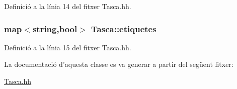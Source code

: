 Definició a la línia 14 del fitxer Tasca.\-hh.

\hypertarget{class_tasca_a02e6c83bd74e95523e8ef9f47b18fa40}{
\subsubsection[{etiquetes}]{\setlength{\rightskip}{0pt plus 5cm}map$<$string,bool$>$ Tasca\-::etiquetes\hspace{0.3cm}{\ttfamily [private]}}}\label{class_tasca_a02e6c83bd74e95523e8ef9f47b18fa40}


Definició a la línia 15 del fitxer Tasca.\-hh.



La documentació d'aquesta classe es va generar a partir del següent fitxer\-:\begin{DoxyCompactItemize}
\item 
\hyperlink{_tasca_8hh}{Tasca.\-hh}\end{DoxyCompactItemize}
